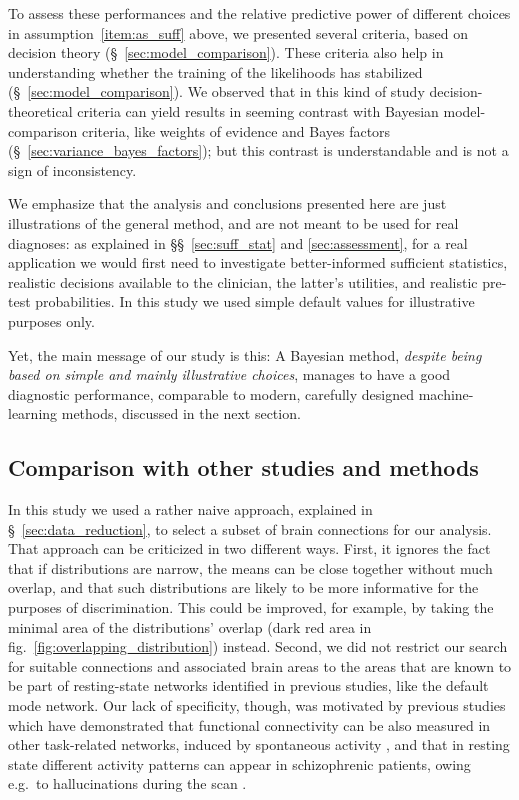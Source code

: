 \documentclass[%
]{frontiersSCNS-nologo} %
\newcommand*{\sect}{\S} %
\newcommand*{\sects}{\S\S} %
\newcommand*{\fig}{fig.} %
\newcommand*{\eg}{e.g.}
\renewcommand*{\|}{\mathpunct{|}}%
\begin{document}
To assess these performances and the relative predictive power of different
choices in assumption~\ref{item:as_suff} above, we presented several
criteria, based on decision theory (\sect~\ref{sec:model_comparison}).
These criteria also help in understanding whether the training of the
likelihoods has stabilized (\sect~\ref{sec:model_comparison}). We observed
that in this kind of study decision-theoretical criteria can yield results
in seeming contrast with Bayesian model-comparison criteria, like weights
of evidence and Bayes factors (\sect~\ref{sec:variance_bayes_factors}); but
this contrast is understandable and is not a sign of inconsistency.

\medskip

We emphasize that the analysis and conclusions presented here are just
illustrations of the general method, and are not meant to be used for real
diagnoses: as explained in \sects~\ref{sec:suff_stat} and
\ref{sec:assessment}, for a real application we would first need to investigate
better-informed sufficient statistics, realistic decisions available to the
clinician, the latter's utilities, and realistic pre-test probabilities. In
this study we used simple default values for illustrative purposes only.

Yet, the main message of our study is this: A Bayesian method,
\emph{despite being based on simple and mainly illustrative choices},
manages to have a good diagnostic performance, comparable to modern,
carefully designed machine-learning methods, discussed in the next section.




\subsection{Comparison with other studies and methods}
\label{sec:comparison_other_studies}

In this study we used a rather naive approach, explained in
\sect~\ref{sec:data_reduction}, to select a subset of brain connections for
our analysis. That approach can be criticized in two different ways. First,
it ignores the fact that if distributions are narrow, the means can be
close together without much overlap, and that such distributions are likely
to be more informative for the purposes of discrimination. This could be
improved, for example, by taking the minimal area of the distributions'
overlap (dark red area in \fig~\ref{fig:overlapping_distribution}) instead.
Second, we did not restrict our search for suitable connections and
associated brain areas to the areas that are known to be part of
resting-state networks identified in previous studies, like the default
mode network. Our lack of specificity, though, was motivated by previous
studies which have demonstrated that functional connectivity can be also
measured in other task-related networks, induced by spontaneous activity
\citep{He2009}, and that in resting state different activity patterns can
appear in schizophrenic patients, owing \eg\ to hallucinations during the
scan \citep[\eg][]{Shergill2000}.
\end{document}
